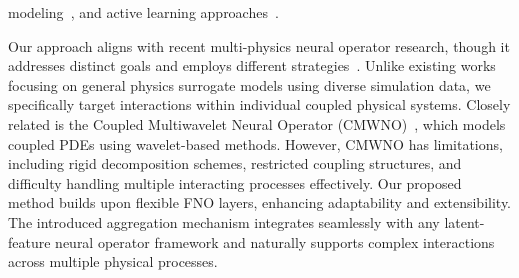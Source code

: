 modeling~\cite{tang2024multi, tang2023large,li2023infinitefidelity}, and active learning approaches~\citep{pmlr-v151-li22b,li2023multiresolution}.

Our approach aligns with recent multi-physics neural operator research, though it addresses distinct goals and employs different strategies~\citep{mccabe2023multiple, rahman2024pretraining, hao2024dpot}. Unlike existing works focusing on general physics surrogate models using diverse simulation data, we specifically target interactions within individual coupled physical systems. Closely related is the Coupled Multiwavelet Neural Operator (CMWNO)~\citep{xiao2023coupled}, which models coupled PDEs using wavelet-based methods. However, CMWNO has limitations, including rigid decomposition schemes, restricted coupling structures, and difficulty handling multiple interacting processes effectively. Our proposed method builds upon flexible FNO layers, enhancing adaptability and extensibility. The introduced aggregation mechanism integrates seamlessly with any latent-feature neural operator framework and naturally supports complex interactions across multiple physical processes.

 



 